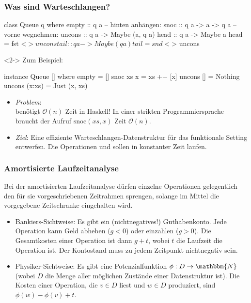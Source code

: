 \documentclass{beamer}
\renewcommand{\O}{\mathcal{O}} %
\newcommand{\N}{\mathbbm{N}} %
\begin{document}
\begin{frame}[fragile]
  \frametitle{Was sind Warteschlangen?}
  \begin{minipage}[t]{0.57 \linewidth}
\begin{haskellcode}
class Queue q where
  empty  :: q a
  -- hinten anhängen:
  snoc   :: q a -> a -> q a
  -- vorne wegnehmen:
  uncons :: q a -> Maybe (a, q a)
  head :: q a -> Maybe a
  head = fst <$> uncons
  tail :: q a -> Maybe (q a)
  tail = snd <$> uncons
\end{haskellcode}
  \end{minipage}
  \begin{minipage}[t]{0.4 \linewidth}
    \begin{visibleenv}<2->
    Zum Beispiel:
\begin{haskellcode}
instance Queue [] where
  empty = []
  snoc xs x = xs ++ [x]
  uncons []
    = Nothing
  uncons (x:xs)
    = Just (x, xs)
\end{haskellcode}
    \end{visibleenv}
  \end{minipage}
  
  \vspace{0.5cm}

  \begin{itemize}
    \item<3-> \emph{Problem}:
    { \centering {}} \\
    benötigt $\O(n)$ Zeit in Haskell! In einer strikten Programmiersprache braucht der Aufruf $\text{snoc}(xs, x)$ Zeit $\O(n)$.
    \item<4-> \emph{Ziel}: Eine effiziente Warteschlangen-Datenstruktur für das funktionale Setting entwerfen.
    Die Operationen  und  sollen in konstanter Zeit laufen.
  \end{itemize}
\end{frame}

\begin{frame}[fragile]
  \frametitle{Amortisierte Laufzeitanalyse}
  
  Bei der amortisierten Laufzeitanalyse dürfen einzelne Operationen gelegentlich den für sie vorgeschriebenen Zeitrahmen sprengen, solange im Mittel die vorgegebene Zeitschranke eingehalten wird.
  
  \begin{itemize}
    \item<2-> Bankiers-Sichtweise: Es gibt ein (nichtnegatives!) Guthabenkonto. Jede Operation kann Geld abheben ($g < 0$) oder einzahlen ($g > 0$). Die Gesamtkosten einer Operation ist dann $g + t$, wobei $t$ die Laufzeit die Operation ist. Der Kontostand muss zu jedem Zeitpunkt nichtnegativ sein.
    \item<3-> Physiker-Sichtweise: Es gibt eine Potenzialfunktion $\phi : D \to \N$ (wobei $D$ die Menge aller möglichen Zustände einer Datenstruktur ist). Die Kosten einer Operation, die $v \in D$ liest und $w \in D$ produziert, sind $\phi(w) - \phi(v) + t$.
  \end{itemize}
\end{frame}
\end{document}
